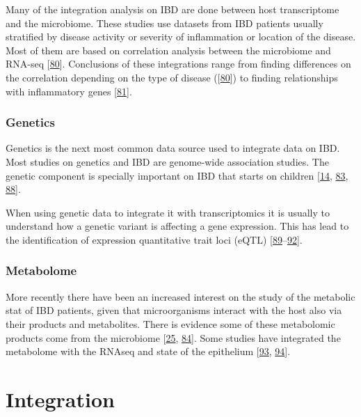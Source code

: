 \documentclass[
  12pt,
  a4paper,
  twoside,
  openright]{book}
\begin{document}
Many of the integration analysis on IBD are done between host transcriptome and the microbiome.
These studies use datasets from IBD patients usually stratified by disease activity or severity of inflammation or location of the disease.
Most of them are based on correlation analysis between the microbiome and RNA-seq {[}\protect\hyperlink{ref-hasler_uncoupling_2016}{80}{]}.
Conclusions of these integrations range from finding differences on the correlation depending on the type of disease ({[}\protect\hyperlink{ref-hasler_uncoupling_2016}{80}{]}) to finding relationships with inflammatory genes {[}\protect\hyperlink{ref-tang2017}{81}{]}.

\hypertarget{genetics-1}{%
\subsubsection{Genetics}\label{genetics-1}}

Genetics is the next most common data source used to integrate data on IBD.
Most studies on genetics and IBD are genome-wide association studies.
The genetic component is specially important on IBD that starts on children {[}\protect\hyperlink{ref-kumar2019}{14}, \protect\hyperlink{ref-huWholeExomeSequencing2021}{83}, \protect\hyperlink{ref-knights2013}{88}{]}.

When using genetic data to integrate it with transcriptomics it is usually to understand how a genetic variant is affecting a gene expression.
This has lead to the identification of expression quantitative trait loci (eQTL) {[}\protect\hyperlink{ref-repnik2016}{89}--\protect\hyperlink{ref-dai2019}{92}{]}.

\hypertarget{metabolome}{%
\subsubsection{Metabolome}\label{metabolome}}

More recently there have been an increased interest on the study of the metabolic stat of IBD patients, given that microorganisms interact with the host also via their products and metabolites.
There is evidence some of these metabolomic products come from the microbiome {[}\protect\hyperlink{ref-ferrer-picuxf3n2020}{25}, \protect\hyperlink{ref-mayorgas2021}{84}{]}.
Some studies have integrated the metabolome with the RNAseq and state of the epithelium {[}\protect\hyperlink{ref-ahmed2016}{93}, \protect\hyperlink{ref-gallagher2021}{94}{]}.

\hypertarget{integration}{%
\section{Integration}\label{integration}}
\end{document}
